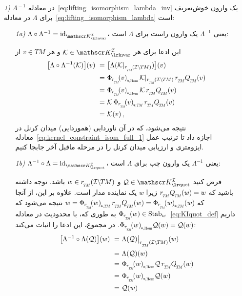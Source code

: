 \begin{itemize}[leftmargin=0cm]
	
	\item[] {\textit{۱)} $\Lambda^{\!-1}$ در معادله~\eqref{eq:lifting_isomorphism_lambda_inv} یک وارون خوش‌تعریف برای $\Lambda$ در معادله~\eqref{eq:lifting_isomorphism_lambda} است: }
	
	\begin{itemize}[leftmargin=1.1cm]
		\setlength\itemsep{2ex}
		
		\item[\textit{1a)}]
		$\Lambda \circ \Lambda^{-1} = \id_{\KIfull}$،
		یعنی $\Lambda^{-1}$ یک وارون راست برای $\Lambda$ است:
		
		این ادعا برای هر $\K\in \KIfull$ و هر $v \in TM$ از
		\begin{align}
			\big[\Lambda \circ \Lambda^{-1} (\K) \big](v)
			\ =&\ \big[ \Lambda(\Krestr) \big](v) \notag \\
			\ =&\ \dPhirHom{v} \, \Krestr    \, \rTM \QTM (v) \notag \\
			\ =&\ \dPhirHom{v} \, \K         \, \rTM \QTM (v) \notag \\
			\ =&\ \K         \, \dPhirTM{v} \, \rTM \QTM (v) \notag \\
			\ =&\ \K(v) \,,
		\end{align}
		نتیجه می‌شود، که در آن ناوردایی (هموردایی) میدان کرنل در معادله~\eqref{eq:kernel_constraint_isom_full_1} اجازه داد تا ترتیب عمل ایزومتری و ارزیابی میدان کرنل را در مرحله ماقبل آخر جابجا کنیم.
		
		\item[\textit{1b)}]
		$\Lambda^{-1} \circ \Lambda = \id_{\KIquot}$،
		یعنی $\Lambda^{-1}$ یک وارون چپ برای $\Lambda$ است:
		
		فرض کنید $\Q\in \KIquot$ و $w \in \rTM(\ITM)$ باشد.
		توجه داشته باشید که $\rTM\QTM(w) = w$ زیرا $w$ یک نماینده مدار است.
		علاوه بر این، از آنجا که $w = \dPhirTM{w}\, \rTM\QTM(w) = \dPhirTM{w} (w)$ نتیجه می‌شود که $\Phir{w} \in \Stab{w}$ به طوری که، با محدودیت در معادله~\eqref{eq:KIquot_def} داریم $\dPhirHom{w} \Q(w) = \Q(w)$.
		در مجموع، این ادعا را اثبات می‌کند:
		\begin{align}
			\big[\Lambda^{-1} \circ \Lambda (\Q) \big](w)
			\ =&\ \Lambda(\Q) \big|_{\rTM(\ITM)}(w) \notag \\
			\ =&\ \Lambda(\Q)(w) \notag \\
			\ =&\ \dPhirHom{w} \Q\, \rTM \QTM(w) \notag \\
			\ =&\ \dPhirHom{w} \Q(w) \notag \\
			\ =&\ \Q(w)
		\end{align}
		

\end{itemize}
\end{itemize}
